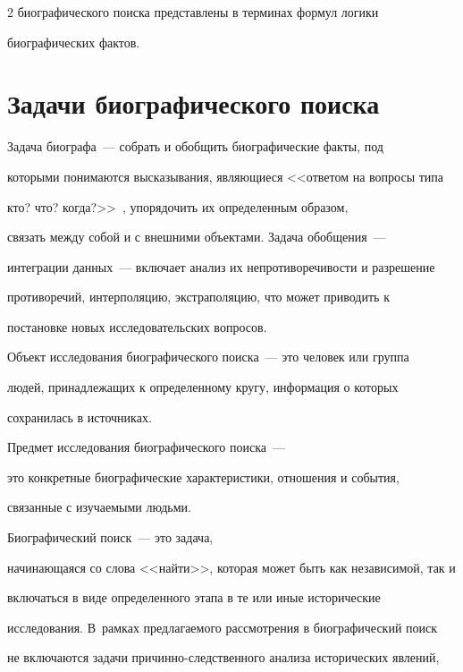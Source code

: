 \begin{multicols}{2}
биографического поиска пред\-став\-ле\-ны в терминах формул логики 


биографических фактов.





\section{Задачи биографического поиска}


  


  Задача биографа~--- собрать и обобщить биографические факты, под 


которыми понимаются высказывания, являющиеся <<ответом на вопросы типа 


кто? что? когда?>>~\cite[с.~53]{4mar}, упорядочить их определенным образом, 


связать между собой и с внешними объектами. Задача обобщения~--- 


интеграции данных~--- включает анализ их непротиво\-ре\-чи\-вости и разрешение 


противоречий, интерполяцию, экстраполяцию, что может приводить к 


постановке новых исследовательских вопросов.


  


  Объект исследования биографического поиска~--- это человек или группа 


людей, принадлежащих к определенному кругу, информация о которых 


сохранилась в источниках. 





Предмет исследования биографического поиска~--- 


это конкретные биографические характеристики, отношения и события, 


связанные с изуча\-емы\-ми людьми. 





Биографический поиск~--- это задача, 


начинающаяся со слова <<найти>>, которая может быть как независимой, так и 


включаться в виде определенного этапа в те или иные исторические 


исследования. В~рамках предлагаемого рассмотрения в биографический поиск 


не включаются задачи при\-чин\-но-след\-ст\-вен\-но\-го анализа исторических явлений, 



\end{multicols}

